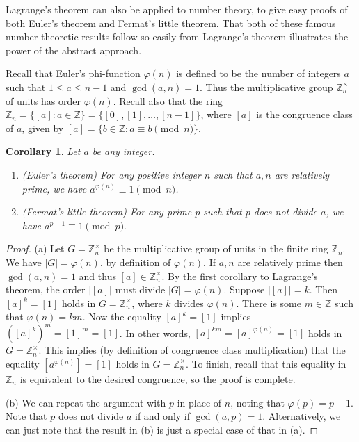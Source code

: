 \documentclass[11pt,oneside]{article}
\newtheorem{cor}[thm]{Corollary}
\theoremstyle{definition}
\newcommand{\Z}{\mathbb{Z}} %
\begin{document}
Lagrange's theorem can also be applied to number theory, to give easy
proofs of both Euler's theorem and Fermat's little theorem. That both
of these famous number theoretic results follow so easily from
Lagrange's theorem illustrates the power of the abstract approach.

Recall that Euler's phi-function
$\varphi(n)$ is defined to be the number of integers $a$ such that
$1 \le a \le n-1$ and $\gcd(a,n) = 1$. Thus the multiplicative group
$\Z_n^\times$ of units has order $\varphi(n)$. Recall also that the
ring $\Z_n = \{ [a] : a \in \Z \} = \{ [0], [1], \dots, [n-1] \}$,
where $[a]$ is the congruence class of $a$, given by
$[a] = \{ b \in \Z : a \equiv b \pmod{n} \}$.

\begin{cor}
  Let $a$ be any integer.
  \begin{enumerate}
  \item (Euler's theorem) For any positive integer $n$ such that $a,
    n$ are relatively prime, we have $a^{\varphi(n)} \equiv 1
    \pmod{n}$.
  \item{} (Fermat's little theorem) For
    any prime $p$ such that $p$ does not divide $a$, we have
    $a^{p-1} \equiv 1 \pmod{p}.$
  \end{enumerate}
\end{cor}

\begin{proof}
(a) Let $G = \Z_n^\times$ be the multiplicative group of units in the
  finite ring $\Z_n$. We have $|G| = \varphi(n)$, by definition of
  $\varphi(n)$. If $a, n$ are relatively prime then $\gcd(a,n)=1$ and
  thus $[a] \in \Z_n^\times$. By the first corollary to Lagrange's
  theorem, the order $|[a]|$ must divide $|G|=\varphi(n)$. Suppose
  $|[a]|=k$. Then $[a]^k = [1]$ holds in $G=\Z_n^\times$, where $k$
  divides $\varphi(n)$. There is some $m \in \Z$ such that $\varphi(n)
  = km$. Now the equality $[a]^k = [1]$ implies $([a]^k)^m = [1]^m =
  [1]$. In other words, $[a]^{km} = [a]^{\varphi(n)} = [1]$ holds in
  $G = \Z_n^\times$. This implies (by definition of congruence class
  multiplication) that the equality $[a^{\varphi(n)}] = [1]$ holds in
  $G = \Z_n^\times$.  To finish, recall that this equality in $\Z_n$
  is equivalent to the desired congruence, so the proof is complete.

(b) We can repeat the argument with $p$ in place of $n$, noting that
  $\varphi(p) = p-1$. Note that $p$ does not divide $a$ if and only if
  $\gcd(a,p) = 1$. Alternatively, we can just note that the result in
  (b) is just a special case of that in (a).
\end{proof}
\end{document}
